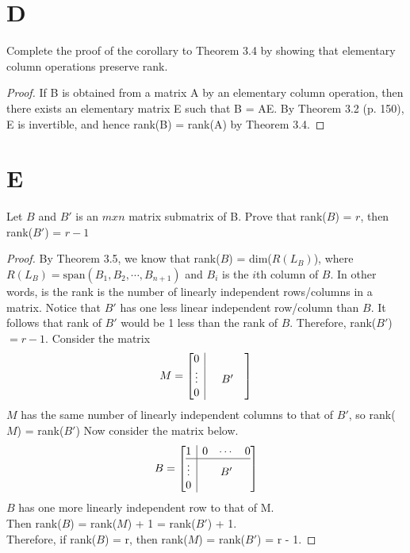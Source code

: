 \documentclass[11pt]{scrartcl}
\begin{document}
\section{D}
Complete the proof of the corollary to Theorem 3.4 by showing that elementary column operations preserve rank.
\begin{proof}
	If B is obtained from a matrix A by an elementary column operation,
	then there exists an elementary matrix E such that B = AE. By Theorem 3.2
	(p. 150), E is invertible, and hence rank(B) = rank(A) by Theorem 3.4. 
\end{proof}
	

\section{E}
Let $B$ and $B'$ is an $mxn$ matrix submatrix of B. Prove that rank($B$) = $r$, then rank($B'$) = $r - 1$
\begin{proof}
By Theorem 3.5, we know that rank($B$) = dim($R(L_B)$), where $R(L_B) = \text{span}(B_1,B_2,\cdots,B_{n+1})$
and $B_i$ is the $i$th column of $B$. In other words, is the rank is the number of linearly independent
rows/columns in a matrix. Notice that $B'$ has one less linear independent row/column than $B$. It follows
that rank of $B'$ would be 1 less than the rank of $B$. Therefore, rank($B'$)$= r - 1$.
Consider the matrix 
\[
M=
\left[\begin{array}{@{}c|ccc@{}}
0 & & & \\
\vdots & & B' & \\
0 & & &
\end{array}\right]	
\]
$M$ has the same number of linearly independent columns to that of $B'$, so rank($M$) = rank($B'$)
Now consider the matrix below.
\[
B=
\left[\begin{array}{@{}c|ccc@{}}
1 & 0 &\cdots &0 \\ \hline
\vdots & & B' & \\
0 & & &
\end{array}\right]	
\]
$B$ has one more linearly independent row to that of M.\\ Then rank($B$) = rank($M$) + 1 = rank($B'$) + 1.\\
Therefore, if rank($B$) = r, then rank($M$) = rank($B'$) = r - 1.
\end{proof}
	
\end{document}
